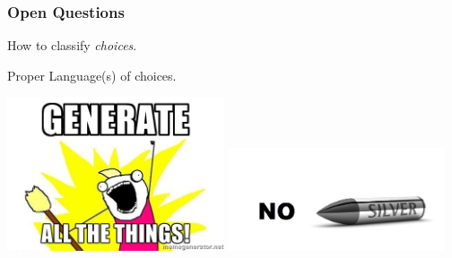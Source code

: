 \documentclass{beamer}
\begin{document}
\begin{frame}
\frametitle{\color{red}Open Questions}
How to classify {\color{blue}\emph{choices}}.

\pause
\vspace*{10mm}
Proper {\color{green}Language(s) of choices}.

\vspace*{5mm}

\end{frame}
% 

\begin{frame}
\includegraphics[width=0.48\textwidth]{generate_all_the_things.jpg}
\includegraphics[width=0.48\textwidth]{no_silver_bullet.jpg}
\end{frame}
\end{document}
